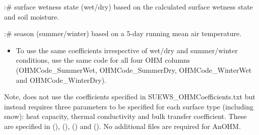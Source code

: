 \documentclass[letterpaper,10pt,english]{sphinxmanual}
\begin{document}
:\# surface wetness state (wet/dry) based on the calculated surface
wetness state and soil moisture.

:\# season (summer/winter) based on a 5-day running mean air temperature.
\begin{itemize}
\item {} 
To use the same coefficients irrespective of wet/dry and
summer/winter conditions, use the same code for all four OHM columns
(OHMCode\_SummerWet, OHMCode\_SummerDry, OHMCode\_WinterWet and
OHMCode\_WinterDry).

\end{itemize}

Note,  does not use the coefficients specified in
SUEWS\_OHMCoefficients.txt but instead requires three parameters to be
specified for each surface type (including snow): heat capacity, thermal
conductivity and bulk transfer coefficient. These are specified in
{\hyperref[\detokenize{input_files/SUEWS_SiteInfo/SUEWS_NonVeg:suews-nonveg-txt}]{}} (),
{\hyperref[\detokenize{input_files/SUEWS_SiteInfo/SUEWS_Veg:suews-veg-txt}]{}} (),
{\hyperref[\detokenize{input_files/SUEWS_SiteInfo/SUEWS_Water:suews-water-txt}]{}} () and
{\hyperref[\detokenize{input_files/SUEWS_SiteInfo/SUEWS_Snow:suews-snow-txt}]{}} (). No additional files are required
for AnOHM.

\end{document}

